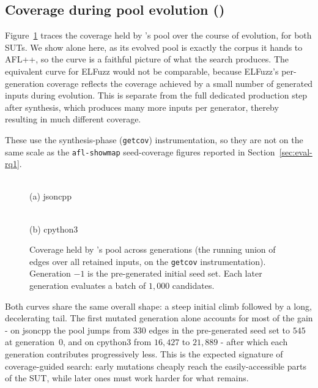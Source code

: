 \subsection{Coverage during pool evolution (\toolname{})}
\label{sec:eval-evolution}

Figure~\ref{fig:direct-evolution} traces the coverage held by \toolname{}'s pool over the course of evolution, for both SUTs. We show \toolname{} alone here, as its evolved pool is exactly the corpus it hands to AFL++, so the curve is a faithful picture of what the search produces. The equivalent curve for ELFuzz would not be comparable, because ELFuzz's per-generation coverage reflects the coverage achieved by a small number of generated inputs during evolution. This is separate from the full dedicated production step after synthesis, which produces many more inputs per generator, thereby resulting in much different coverage.

These use the synthesis-phase (\texttt{getcov}) instrumentation, so they are not on the same scale as the \texttt{afl-showmap} seed-coverage figures reported in Section~\ref{sec:eval-rq1}.

\begin{figure}[H]
    \centering
    \begin{minipage}[t]{0.49\linewidth}\centering
        \\[2pt]
        {\small (a) jsoncpp}
    \end{minipage}\hfill
    \begin{minipage}[t]{0.49\linewidth}\centering
        \\[2pt]
        {\small (b) cpython3}
    \end{minipage}
    \caption{Coverage held by \toolname{}'s pool across generations (the running union of edges over all retained inputs, on the \texttt{getcov} instrumentation). Generation $-1$ is the pre-generated initial seed set. Each later generation evaluates a batch of $1{,}000$ candidates.}
    \label{fig:direct-evolution}
\end{figure}

Both curves share the same overall shape: a steep initial climb followed by a long, decelerating tail. The first mutated generation alone accounts for most of the gain - on jsoncpp the pool jumps from $330$ edges in the pre-generated seed set to $545$ at generation~$0$, and on cpython3 from $16{,}427$ to $21{,}889$ - after which each generation contributes progressively less. This is the expected signature of coverage-guided search: early mutations cheaply reach the easily-accessible parts of the SUT, while later ones must work harder for what remains.

